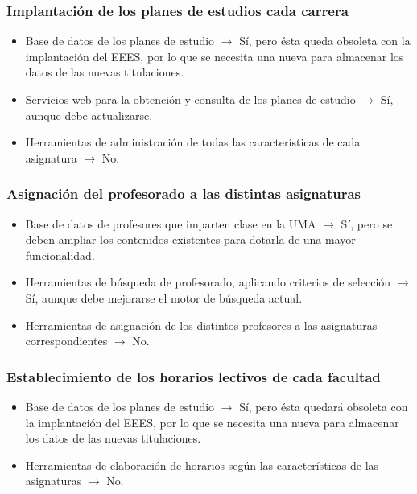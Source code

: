 \documentclass[11pt,a4paper,spanish,twoside]{book}
\begin{document}
\subsubsection{Implantación de los planes de estudios cada carrera}
\begin{itemize}
\item Base de datos de los planes de estudio $\to$ Sí, pero ésta queda
  obsoleta con la implantación del EEES, por lo que se
  necesita una nueva para almacenar los datos de las nuevas titulaciones. 
\item Servicios web para la obtención y consulta de los planes de estudio
  $\to$ Sí, aunque debe actualizarse. 
\item Herramientas de administración de todas las características de cada
  asignatura $\to$ No. 
\end{itemize}

\subsubsection{Asignación del profesorado a las distintas asignaturas}
\begin{itemize}
\item Base de datos de profesores que imparten clase en la UMA $\to$ Sí, pero
  se deben ampliar los contenidos existentes para dotarla de una mayor
  funcionalidad. 
\item Herramientas de búsqueda de profesorado, aplicando criterios de
  selección $\to$ Sí, aunque debe mejorarse el motor de búsqueda actual. 
\item Herramientas de asignación de los distintos profesores a las
  asignaturas correspondientes $\to$ No.
\end{itemize}

\subsubsection{Establecimiento de los horarios lectivos de cada facultad}
\begin{itemize}
\item Base de datos de los planes de estudio $\to$ Sí, pero ésta quedará
  obsoleta con la implantación del EEES, por lo que se
  necesita una nueva para almacenar los datos de las nuevas titulaciones. 
\item Herramientas de elaboración de horarios según las características de
  las asignaturas $\to$ No. 
\end{itemize}
\end{document}
